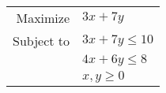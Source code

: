 \begin{tabular}{rl}
        Maximize & $3x + 7y$ \\[10pt]
        Subject to & $3x + 7y \leq 10$ \\
                   & $4x + 6y \leq 8$ \\
                   & $x, y \geq 0$
    \end{tabular}
